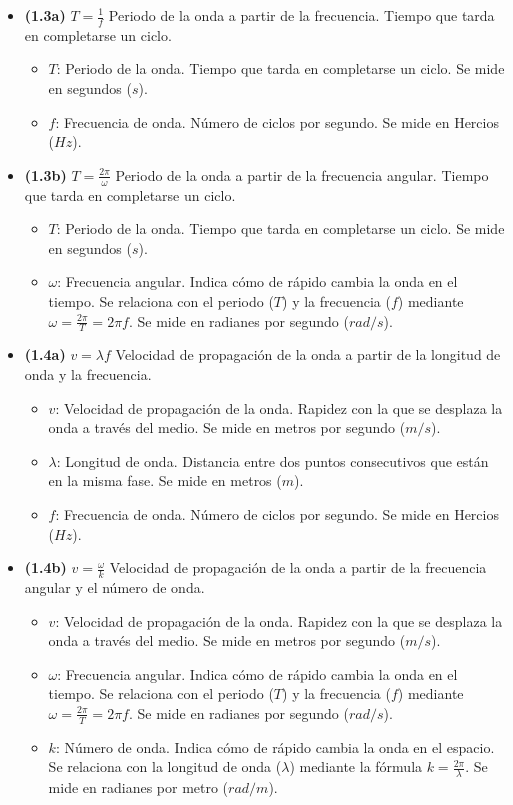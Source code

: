 \documentclass{article}
\begin{document}
\begin{itemize}
				\item \textbf{(1.3a)} $\boxed{T=\frac{1}{f}}$ Periodo de la onda a partir de la frecuencia. Tiempo que tarda en completarse un ciclo.
					\begin{itemize}
						\item $T$: Periodo de la onda. Tiempo que tarda en completarse un ciclo. Se mide en segundos ($s$).
						\item $f$: Frecuencia de onda. Número de ciclos por segundo. Se mide en Hercios ($Hz$).
					\end{itemize}

				\item \textbf{(1.3b)} $\boxed{T=\frac{2\pi}{\omega}}$ Periodo de la onda a partir de la frecuencia angular. Tiempo que tarda en completarse un ciclo.
					\begin{itemize}
						\item $T$: Periodo de la onda. Tiempo que tarda en completarse un ciclo. Se mide en segundos ($s$).
						\item $\omega$: Frecuencia angular. Indica cómo de rápido cambia la onda en el tiempo. Se relaciona con el periodo ($T$) y la frecuencia ($f$) mediante $\omega = \frac{2\pi}{T} = 2\pi f$. Se mide en radianes por segundo ($rad/s$).
					\end{itemize}

				\item \textbf{(1.4a)} $\boxed{v=\lambda f}$ Velocidad de propagación de la onda a partir de la longitud de onda y la frecuencia.
					\begin{itemize}
						\item $v$: Velocidad de propagación de la onda. Rapidez con la que se desplaza la onda a través del medio. Se mide en metros por segundo ($m/s$).
						\item $\lambda$: Longitud de onda. Distancia entre dos puntos consecutivos que están en la misma fase. Se mide en metros ($m$).
						\item $f$: Frecuencia de onda. Número de ciclos por segundo. Se mide en Hercios ($Hz$).
					\end{itemize}

				\item \textbf{(1.4b)} $\boxed{v=\frac{\omega}{k}}$ Velocidad de propagación de la onda a partir de la frecuencia angular y el número de onda.
					\begin{itemize}
						\item $v$: Velocidad de propagación de la onda. Rapidez con la que se desplaza la onda a través del medio. Se mide en metros por segundo ($m/s$).
						\item $\omega$: Frecuencia angular. Indica cómo de rápido cambia la onda en el tiempo. Se relaciona con el periodo ($T$) y la frecuencia ($f$) mediante $\omega = \frac{2\pi}{T} = 2\pi f$. Se mide en radianes por segundo ($rad/s$).
						\item $k$: Número de onda. Indica cómo de rápido cambia la onda en el espacio. Se relaciona con la longitud de onda ($\lambda$) mediante la fórmula $k = \frac{2\pi}{\lambda}$. Se mide en radianes por metro ($rad/m$).
					\end{itemize}
			\end{itemize}
\end{document}
